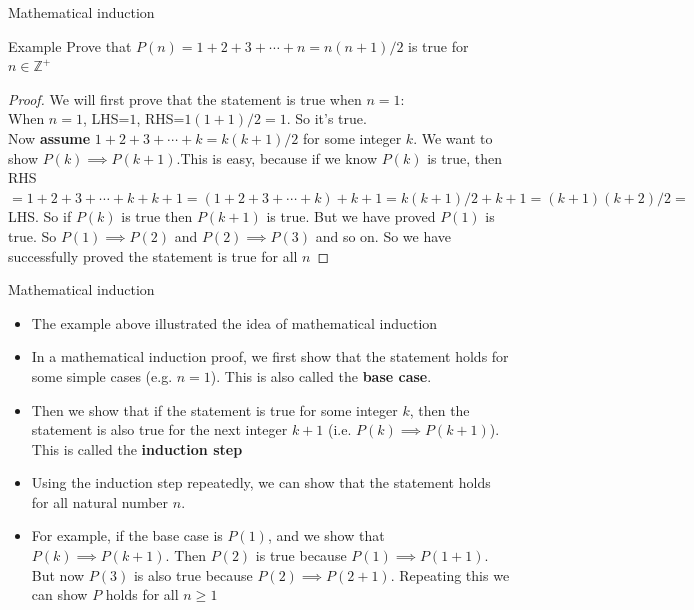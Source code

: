 \documentclass[10pt,xcolor={table,dvipsnames},t]{beamer}
\begin{document}
\begin{frame}{Mathematical induction}
  \begin{exampleblock}{Example}
    Prove that $P(n)=1+2+3+\cdots + n = n(n+1)/2$ is true for $n \in \mathbb{Z}^+$
    \begin{proof}
      We will first prove that the statement is true when $n=1$:\\
      When $n=1$, LHS=$1$, RHS=$1(1+1)/2=1$. So it's true.\\
      Now \textbf{assume} $1+2+3+\cdots + k = k(k+1)/2$ for some integer $k$. We want to show $P(k)\implies P(k+1)$.This is easy, because if we know $P(k)$ is true, then RHS$=1+2+3+\cdots + k + k+1 = (1+2+3+\cdots + k) + k+1 = k(k+1)/2 + k+1 = (k+1)(k+2)/2=$LHS. So if $P(k)$ is true then $P(k+1)$ is true. But we have proved $P(1)$ is true. So $P(1)\implies P(2)$ and $P(2)\implies P(3)$ and so on. So we have successfully proved the statement is true for all $n$  
    \end{proof}
  \end{exampleblock}
\end{frame}

\begin{frame}{Mathematical induction}
  \begin{itemize}
    \item The example above illustrated the idea of mathematical induction
    \item In a mathematical induction proof, we first show that the statement holds for some simple cases (e.g. $n=1$). This is also called the \textbf{base case}.
    \item Then we show that if the statement is true for some integer $k$, then the statement is also true for the next integer $k+1$ (i.e. $P(k)\implies P(k+1)$). This is called the \textbf{induction step}
    \item Using the induction step repeatedly, we can show that the statement holds for all natural number $n$. 
    \item For example, if the base case is $P(1)$, and we show that $P(k)\implies P(k+1)$. Then $P(2)$ is true because $P(1)\implies P(1+1)$. But now $P(3)$ is also true because $P(2)\implies P(2+1)$. Repeating this we can show $P$ holds for all $n\geq 1$
  \end{itemize}
\end{frame}
\end{document}
